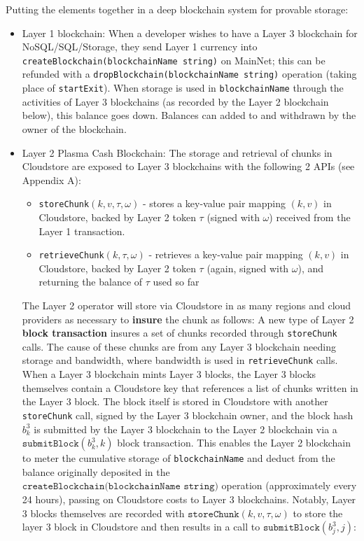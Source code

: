 \documentclass{article}
\newcommand{\blockhash}[2]{b^{#1}_{#2}}
\newcommand{\signature}{\omega}
\newcommand{\submitblock}[2]{\texttt{submitBlock}(#2, #1)}
\begin{document}
Putting the elements together in a deep blockchain system for provable storage:
\begin{itemize}
\item Layer 1 blockchain: When a developer wishes to have a Layer 3 blockchain for NoSQL/SQL/Storage, they send Layer 1 currency into \texttt{createBlockchain(blockchainName string)} on MainNet; this can be refunded with a {\tt dropBlockchain(blockchainName string)} operation (taking place of {\tt startExit}).  When storage is used in {\tt blockchainName} through the activities of Layer 3 blockchains (as recorded by the Layer 2 blockchain below), this balance goes down.  Balances can added to and withdrawn by the owner of the blockchain.

\item Layer 2 Plasma Cash Blockchain: The storage and retrieval of chunks in Cloudstore are exposed to Layer 3 blockchains with the following 2 APIs (see Appendix A):
\begin{itemize}
    \item \texttt{storeChunk}$(k, v, \tau, \signature)$ - stores a key-value pair mapping $(k,v)$ in Cloudstore, backed by Layer 2 token $\tau$ (signed with $\signature$) received from the Layer 1 transaction.
    \item \texttt{retrieveChunk}$(k, \tau, \signature)$ - retrieves a key-value pair mapping $(k,v)$ in Cloudstore, backed by Layer 2 token $\tau$ (again, signed with $\signature$), and returning the balance of $\tau$ used so far
\end{itemize}
The Layer 2 operator will store via Cloudstore in as many regions and cloud providers as necessary to {\bf insure} the chunk as follows:  A new type of Layer 2 {\bf block transaction} insures a set of chunks recorded through \texttt{storeChunk} calls.  The cause of these chunks are from any Layer 3 blockchain needing storage and bandwidth, where bandwidth is used in \texttt{retrieveChunk} calls.  When a Layer 3 blockchain mints Layer 3 blocks, the Layer 3 blocks themselves contain a Cloudstore key that references a list of chunks written in the Layer 3 block.  The block itself is stored in Cloudstore with another \texttt{storeChunk} call, signed by the Layer 3 blockchain owner, and the block hash $\blockhash{3}{k}$ is submitted by the Layer 3 blockchain to the Layer 2 blockchain via a $\submitblock{k}{\blockhash{3}{k}}$ block transaction.  This enables the Layer 2 blockchain to meter the cumulative storage of {\tt blockchainName} and deduct from the balance originally deposited in the $\texttt{createBlockchain(blockchainName string)}$ operation (approximately every 24 hours), passing on Cloudstore costs to Layer 3 blockchains.  Notably, Layer 3 blocks themselves are recorded with $\texttt{storeChunk}(k, v, \tau, \signature)$ to store the layer 3 block in Cloudstore and then results in a call to $\submitblock{j}{\blockhash{3}{j}}$:

\end{itemize}
\end{document}
